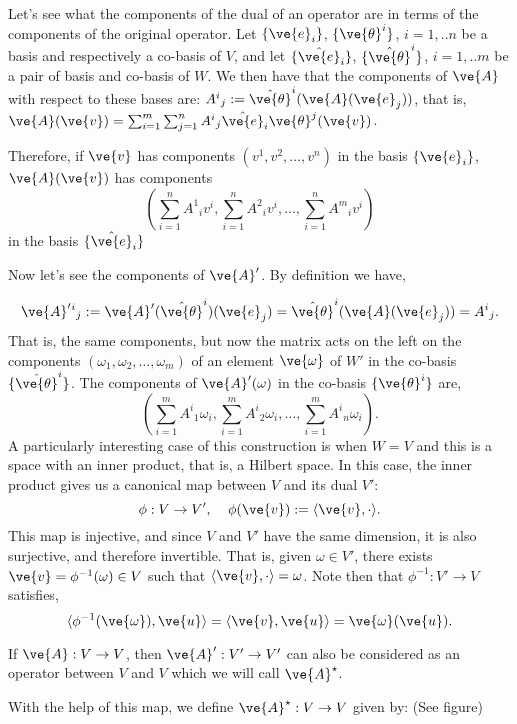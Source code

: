 {Let's see what the components of the dual of an operator are in terms of
the components of the original operator. 
Let $\{\ve{e}_i\}$, $\{\ve{\theta}^i\}$, $i=1,..n$ be a basis and respectively
a co-basis of $V$, and let $\{\hat{\ve{e}}_i\}$, $\{\hat{\ve{\theta}}^i\}$, 
$i=1,..m$
be a pair of basis and co-basis of $W$.
We then have that the components of $\ve{A}$ with respect to these bases
are: 
$A^i{}_j := \hat{\ve{\theta}}^i(\ve{A}(\ve{e}_j))$, 
that is,
$\ve{A}(\ve{v}) = 
\sum_{i=1}^{m} \sum_{j=1}^{n} A^i{}_j \hat{\ve{e}}_i\ve{\theta}^j(\ve{v})$.

Therefore, if $\ve{v}$ has components $(v^1,v^2,\dots,v^n)$ in the 
basis $\{\ve{e}_i\}$, $\ve{A}(\ve{v})$ has components 
\[
(\sum_{i=1}^{n} A^1{}_iv^i, \sum_{i=1}^{n} A^2{}_iv^i,\dots,\sum_{i=1}^{n} A^m{}_iv^i)
\]
%
 in the basis $\{\hat{\ve{e}}_i\}$

Now let's see the components of $\ve{A}'$. 
By definition we have,

\[
\ve{A}'{}^i{}_j := \ve{A}'(\hat{\ve{\theta}}^i)(\ve{e}_j) 
                  =  \hat{\ve{\theta}}^i(\ve{A}(\ve{e}_j)) = A^i{}_j.
\]
That is, the same components, but now the matrix acts on the left on
the components $(\omega_1,\omega_2,\dots, \omega_m)$ of an element 
$\ve{\omega}$ of $W'$ in the co-basis $\{\hat{\ve{\theta}}^i\}$.
The components of $\ve{A}'(\omega)$ in the co-basis $\{\ve{\theta}^i\}$ are,
\[ 
(\sum_{i=1}^{m}A^i{}_1\omega_i, \sum_{i=1}^{m}A^i{}_2\omega_i,\dots,\sum_{i=1}^{m}A^i{}_n\omega_i).
\]
%
A particularly interesting case of this construction is when
$W=V$ and this is a space with an inner product, that is, a 
Hilbert space. In this case, the inner product gives us a canonical map between
$V$ and its dual $V'$:
\begin{equation}
  \label{eq:mapa_canonico}
  \phi:V \to V', \;\;\;\; \phi(\ve{v}) := \langle \ve{v},\cdot \rangle.
\end{equation}
%
This map is injective, and since $V$ and $V'$ have the same dimension, it is also surjective, and therefore invertible. 
That is, given $\omega \in V'$, there exists $\ve{v}=\phi^{-1}(\omega) \in V$ such that $\langle \ve{v},\cdot \rangle = \omega$. 
Note then that $\phi^{-1}: V' \to V$ satisfies, 
\[
\langle \phi^{-1}(\ve{\omega}),\ve{u} \rangle = \langle \ve{v},\ve{u} \rangle = \ve{\omega}(\ve{u}).
\]


If $\ve{A}: V \to V$, then $\ve{A}': V' \to V'$
can also be considered as an operator between $V$ and $V$
which we will call $\ve{A}^{\star}$.


%
With the help of this map, we define $\ve{A}^{\star}: V \to V$ given by:
(See figure)

}
